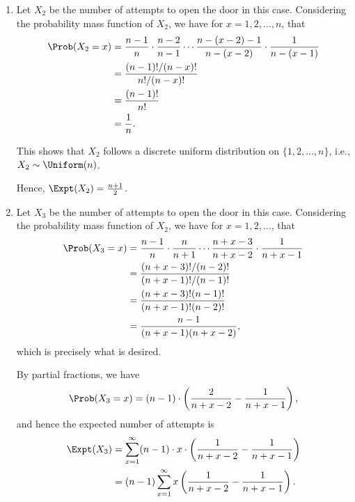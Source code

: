 \begin{enumerate}
    \item Let \(X_2\) be the number of attempts to open the door in this case. Considering the probability mass function of \(X_2\), we have for \(x = 1, 2, \ldots, n\), that
          \begin{align*}
              \Prob(X_2 = x) & = \frac{n - 1}{n} \cdot \frac{n - 2}{n - 1} \cdots \frac{n - (x - 2) - 1}{n - (x - 2)} \cdot \frac{1}{n - (x - 1)} \\
                             & = \frac{(n - 1)! / (n - x)!}{n! / (n - x)!}                                                                        \\
                             & = \frac{(n - 1)!}{n!}                                                                                              \\
                             & = \frac{1}{n}.
          \end{align*}

          This shows that \(X_2\) follows a discrete uniform distribution on \(\{1, 2, \ldots, n\}\), i.e., \(X_2 \sim \Uniform(n)\).

          Hence, \(\Expt(X_2) = \frac{n + 1}{2}\).

    \item Let \(X_3\) be the number of attempts to open the door in this case. Considering the probability mass function of \(X_2\), we have for \(x = 1, 2, \ldots\), that
          \begin{align*}
              \Prob(X_3 = x) & = \frac{n - 1}{n} \cdot \frac{n}{n + 1} \cdots \frac{n + x - 3}{n + x - 2} \cdot \frac{1}{n + x - 1} \\
                             & = \frac{(n + x - 3)! / (n - 2)!}{(n + x - 1)! / (n - 1)!}                                            \\
                             & = \frac{(n + x - 3)! (n - 1)!}{(n + x - 1)! (n - 2)!}                                                \\
                             & = \frac{n - 1}{(n + x - 1) (n + x - 2)},
          \end{align*}
          which is precisely what is desired.

          By partial fractions, we have
          \[
              \Prob(X_3 = x) = (n - 1) \cdot \left(\frac{2}{n + x - 2} - \frac{1}{n + x - 1}\right),
          \]
          and hence the expected number of attempts is
          \begin{align*}
              \Expt(X_3) & = \sum_{x = 1}^{\infty} (n - 1) \cdot x \cdot \left(\frac{1}{n + x - 2} - \frac{1}{n + x - 1}\right) \\
                         & = (n - 1) \sum_{x = 1}^{\infty} x \left(\frac{1}{n + x - 2} - \frac{1}{n + x - 1}\right).
          \end{align*}


\end{enumerate}
